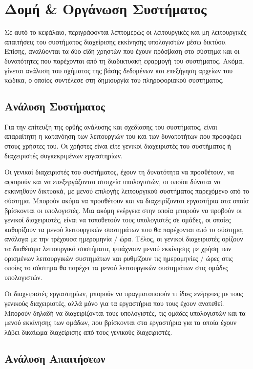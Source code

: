 \chapter{Δομή \& Οργάνωση Συστήματος}
Σε αυτό το κεφάλαιο, περιγράφονται λεπτομερώς οι λειτουργικές και μη-λειτουργικές απαιτήσεις του συστήματος διαχείρισης εκκίνησης υπολογιστών μέσω δικτύου. Επίσης, αναλύονται τα δύο είδη χρηστών που έχουν πρόσβαση στο σύστημα και οι δυνατότητες που παρέχονται από τη διαδικτυακή εφαρμογή του συστήματος. Ακόμα, γίνεται ανάλυση του σχήματος της βάσης δεδομένων και επεξήγηση αρχείων του κώδικα, ο οποίος συντέλεσε στη δημιουργία του πληροφοριακού συστήματος.

\section{Ανάλυση Συστήματος}
Για την επίτευξη της ορθής ανάλυσης και σχεδίασης του συστήματος, είναι απαραίτητη η κατανόηση των λειτουργιών του και των δυνατοτήτων που προσφέρει στους χρήστες του. Οι χρήστες είναι είτε γενικοί διαχειριστές του συστήματος ή διαχειριστές συγκεκριμένων εργαστηρίων.

Οι γενικοί διαχειριστές του συστήματος, έχουν τη δυνατότητα να προσθέτουν, να αφαιρούν και να επεξεργάζονται στοιχεία υπολογιστών, οι οποίοι δύναται να εκκινηθούν δικτυακά, με μενού επιλογής λειτουργικού συστήματος παρεχόμενο από το σύστημα. Μπορούν ακόμα να προσθέτουν και να διαχειρίζονται εργαστήρια στα οποία βρίσκονται οι υπολογιστές. Μια ακόμη ενέργεια στην οποία μπορούν να προβούν οι γενικοί διαχειριστές, είναι να τοποθετούν τους υπολογιστές σε ομάδες, οι οποίες καθορίζουν τα μενού λειτουργικών συστημάτων που θα παρέχονται από το σύστημα, ανάλογα με την τρέχουσα ημερομηνία / ώρα. Τέλος, οι γενικοί διαχειριστές ορίζουν τα διαθέσιμα λειτουργικά συστήματα, φτιάχνουν μενού εκκίνησης με χρήση των ορισμένων λειτουργικών συστημάτων και ρυθμίζουν τις ημερομηνίες / ώρες στις οποίες το σύστημα θα παρέχει τα μενού λειτουργικών συστημάτων στις ομάδες υπολογιστών.

Οι διαχειριστές εργαστηρίων, μπορούν να πραγματοποιούν τι ίδιες ενέργειες με τους γενικούς διαχειριστές, αλλά μόνο για τα εργαστήρια που τους έχουν ανατεθεί. Μπορούν δηλαδή να διαχειρίζονται τους υπολογιστές, τις ομάδες υπολογιστών και τα μενού εκκίνησης των ομάδων, που βρίσκονται στα εργαστήρια για τα οποία έχουν λάβει δικαίωμα διαχείρισης από τους γενικούς διαχειριστές.
 
\section{Ανάλυση Απαιτήσεων}

